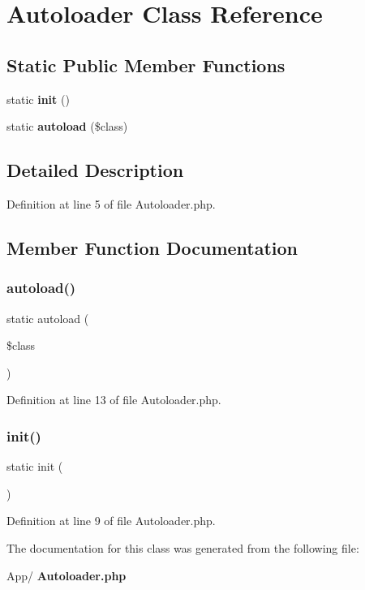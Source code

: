 \section{Autoloader Class Reference}
\label{class_autoloader}
\subsection*{Static Public Member Functions}
\begin{DoxyCompactItemize}
\item 
static \textbf{ init} ()
\item 
static \textbf{ autoload} (\$class)
\end{DoxyCompactItemize}


\subsection{Detailed Description}


Definition at line 5 of file Autoloader.\+php.



\subsection{Member Function Documentation}
\mbox{\label{class_autoloader_ab4c022bf9d3474583030f31894865182}} 
\subsubsection{autoload()}
{\footnotesize\ttfamily static autoload (\begin{DoxyParamCaption}\item[{}]{\$class }\end{DoxyParamCaption})\hspace{0.3cm}{\ttfamily [static]}}



Definition at line 13 of file Autoloader.\+php.

\mbox{\label{class_autoloader_a9f0be6ae273d3669e11c29910a0be338}} 
\subsubsection{init()}
{\footnotesize\ttfamily static init (\begin{DoxyParamCaption}{ }\end{DoxyParamCaption})\hspace{0.3cm}{\ttfamily [static]}}



Definition at line 9 of file Autoloader.\+php.



The documentation for this class was generated from the following file\+:\begin{DoxyCompactItemize}
\item 
App/\textbf{ Autoloader.\+php}\end{DoxyCompactItemize}
